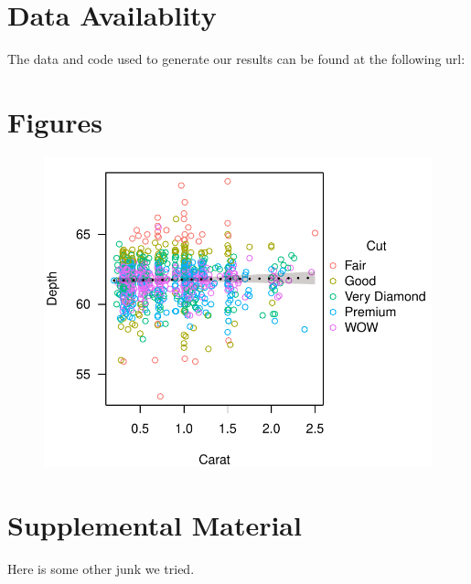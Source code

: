 \documentclass[11pt,letterpaper]{article} %
\begin{document}
\section*{Data Availablity}
The data and code used to generate our results can be found at the following url: 





\pagebreak
\section*{Figures}

\begin{figure}[h!] %
  \centering
    \includegraphics[width=1\textwidth]{depth_by_carat.pdf}
    \caption{\protect}
  \label{depth_by_carat} %
\end{figure}


\pagebreak
\section*{Supplemental Material}

Here is some other junk we tried.
\end{document}

